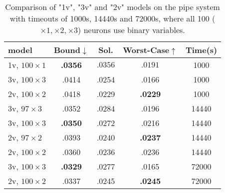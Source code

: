 		
	\begin{table}[h!]
	\begin{tabular}{||l||c|c|c|c||}\hline\hline
		model &        Bound$\downarrow$ &  Sol. &      Worst-Case$\uparrow$ &  Time(s) \\\hline \hline
		1v, $100 \times 1$ &     {\bf .0356} &  $.0356$ & $.0191$ &  1000 \\\hline
		3v, $100 \times 3$&     .0414 &  .0254 &  .0166 &  1000 \\\hline
		2v, $100 \times 2$&     .0418 &  .0229 &   {\bf .0229} &  1000 \\\hline \hline
	3v, $97 \times 3$&     .0352 &  .0284 &  .0196 & 14440 \\\hline
		3v, $100 \times 3$&      {\bf .0350} &  .0272 &  .0216 & 14440 \\\hline
	2v, $97 \times 2$&     .0393 &  .0240 &   {\bf .0237} & 14440 \\\hline
		2v, $100 \times 2$&     .0360 &  .0236 &   .0236 & 14440 \\\hline \hline
		3v, $100 \times 3$&     {\bf .0329} &  .0277 &  .0165 & 72000 \\\hline
		2v, $100 \times 2$&     .0337 &  .0245 &  {\bf .0245} & 72000 \\\hline\hline
	\end{tabular}
	\caption{Comparison of "1v", "3v" and "2v" models on the pipe system with timeouts of 1000s, 14440s and 72000s, where all 100 ($\times 1, \times 2,\times 3$) neurons use binary variables.}
	\label{table.pipe}
\end{table}



